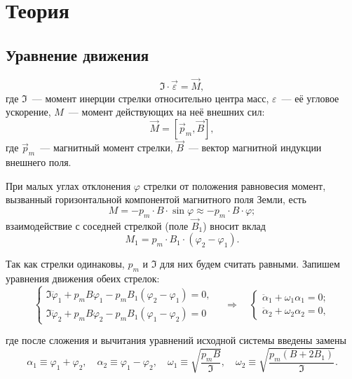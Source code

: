 \documentclass{letask}
\begin{document}
\section{Теория}

\subsection{Уравнение движения}  

\begin{equation}
\mathfrak{I} \cdot \vec{\varepsilon} = \vec{M},
\end{equation}
где $\mathfrak{I}$~--- момент инерции стрелки относительно центра масс, $\varepsilon$~--- её угловое ускорение, $M$~--- момент действующих на неё внешних сил:
\begin{equation}
\vec{M} = \left[ \vec{p}_m, \vec{B} \right],
\end{equation}
где $\vec{p}_m$~--- магнитный момент стрелки, $\vec{B}$~--- вектор магнитной индукции внешнего поля.

При малых углах отклонения $\varphi$ стрелки от положения равновесия момент, вызванный горизонтальной компонентой магнитного поля Земли, есть
\begin{equation}
M = - p_m \cdot B \cdot \sin \varphi \approx - p_m \cdot B \cdot \varphi;
\end{equation}
взаимодействие с соседней стрелкой (поле $\vec{B}_1$) вносит вклад
\begin{equation}
M_1 = p_m \cdot B_1 \cdot (\varphi_2 - \varphi_1).
\end{equation}

Так как стрелки одинаковы, $p_m$ и $\mathfrak{I}$ для них будем считать равными. Запишем уравнения движения обеих стрелок:
\begin{equation}
\begin{cases}
\mathfrak{I} \ddot{\varphi}_1 + p_m B \varphi_1 - p_m B_1 (\varphi_2 - \varphi_1) = 0, \\
\mathfrak{I} \ddot{\varphi}_2 + p_m B \varphi_2 - p_m B_1 (\varphi_1 - \varphi_2) = 0
\end{cases}
\quad \Rightarrow \quad
\begin{cases}
\ddot{\alpha}_1 + \omega_1 \alpha_1 = 0; \\
\ddot{\alpha}_2 + \omega_2 \alpha_2 = 0,
\end{cases}
\end{equation}

где после сложения и вычитания уравнений исходной системы введены замены
$$ \alpha_1 \equiv \varphi_1 + \varphi_2, \quad
\alpha_2 \equiv \varphi_1 - \varphi_2, \quad
\omega_1 \equiv \sqrt{\dfrac{p_m B}{\mathfrak{I}}}, \quad
\omega_2 \equiv \sqrt{\dfrac{p_m(B+2B_1)}{\mathfrak{I}}}. $$
\end{document}
